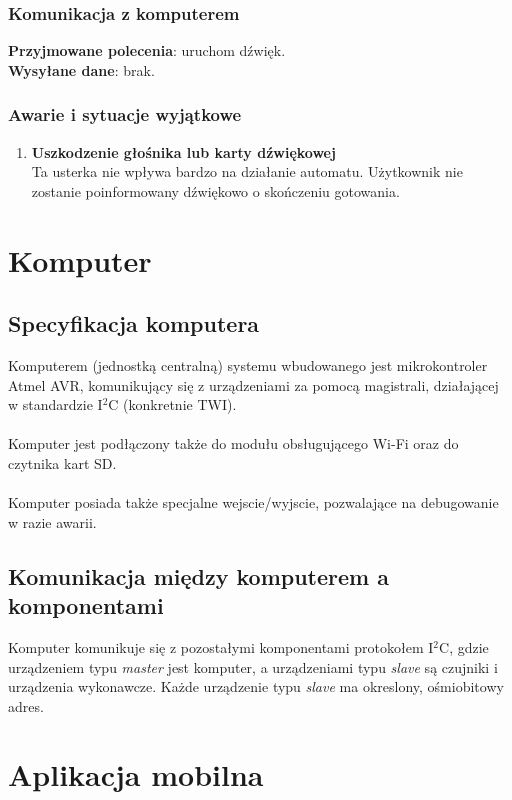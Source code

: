 \documentclass[12pt,a4paper,notitlepage]{article}
\begin{document}
\subsubsection{Komunikacja z komputerem}
\textbf{Przyjmowane polecenia}: uruchom dźwięk.\\
\textbf{Wysyłane dane}: brak.

\subsubsection{Awarie i sytuacje wyjątkowe}
\begin{enumerate}
  \item \textbf{Uszkodzenie głośnika lub karty dźwiękowej}\\
Ta usterka nie wpływa bardzo na działanie automatu. Użytkownik nie zostanie poinformowany dźwiękowo o skończeniu gotowania.
\end{enumerate}

\section{Komputer}

\subsection{Specyfikacja komputera}

Komputerem (jednostką centralną) systemu wbudowanego jest mikrokontroler Atmel AVR, komunikujący się z urządzeniami za pomocą magistrali, działającej w standardzie I$^2$C (konkretnie TWI). \\ \\
Komputer jest podłączony także do modułu obsługującego Wi-Fi oraz do czytnika kart SD. 
\\ \\
Komputer posiada także specjalne wejscie/wyjscie, pozwalające na debugowanie w razie awarii.

\subsection{Komunikacja między komputerem a komponentami}
Komputer komunikuje się z pozostałymi komponentami protokołem I$^2$C, gdzie urządzeniem typu \emph{master} jest komputer, a urządzeniami typu \emph{slave} są czujniki i urządzenia wykonawcze. Każde urządzenie typu \emph{slave} ma okreslony, ośmiobitowy adres. 

\section{Aplikacja mobilna}
\end{document}
